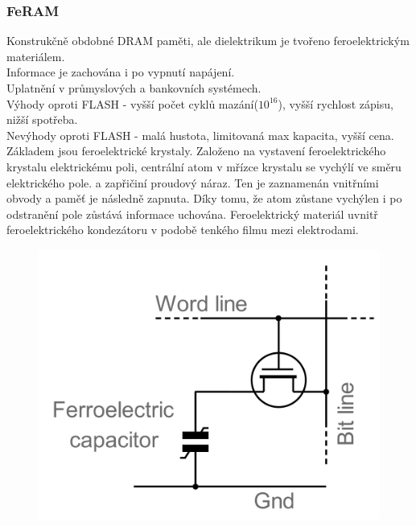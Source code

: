 \subsubsection*{FeRAM}
Konstrukčně obdobné DRAM paměti, ale dielektrikum je tvořeno feroelektrickým materiálem.\\
Informace je zachována i po vypnutí napájení.\\
Uplatnění v průmyslových a bankovních systémech.\\
Výhody oproti FLASH - vyšší počet cyklů mazání($10^16$), vyšší rychlost zápisu, nižší spotřeba.\\
Nevýhody oproti FLASH - malá hustota, limitovaná max kapacita, vyšší cena.
Základem jsou feroelektrické krystaly. Založeno na vystavení feroelektrického krystalu elektrickému poli, centrální atom v mřízce krystalu se vychýlí ve směru elektrického pole. a zapřičiní proudový náraz. Ten je zaznamenán vnitřními obvody a paměť je následně zapnuta. Díky tomu, že atom zůstane vychýlen i po odstranění pole zůstává informace uchována.
Feroelektrický materiál uvnitř feroelektrického kondezátoru v podobě tenkého filmu mezi elektrodami.
\begin{figure} [h!]
    \centering
    \includegraphics*[scale = 0.3]{img/FeRAM.png}
\end{figure}

